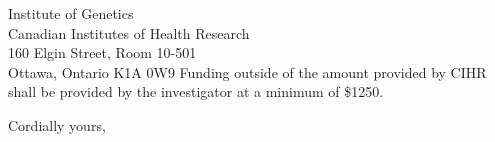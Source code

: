 \documentclass{letter}
\begin{document}
\begin{letter}{Institute of Genetics \\ Canadian Institutes of Health Research \\ 160 Elgin Street, Room 10-501 \\ Ottawa, Ontario K1A 0W9}
Funding outside of the amount provided by CIHR shall be provided by the investigator at a minimum of \$1250.

\closing{Cordially yours,}
\end{letter}
\end{document}
